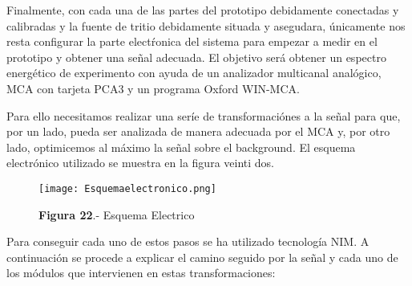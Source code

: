 Finalmente, con cada una de las partes del prototipo debidamente conectadas y calibradas y la fuente de tritio debidamente situada y asegudara, únicamente nos resta configurar la parte electŕonica del sistema para empezar a medir en el prototipo y obtener una señal adecuada. El objetivo será obtener un espectro energético de experimento con ayuda de un analizador multicanal analógico, MCA con tarjeta PCA3 y un programa Oxford WIN-MCA. 

Para ello necesitamos realizar una seríe de transformaciónes a la señal para que, por un lado,  pueda ser analizada de manera adecuada por el MCA y, por otro lado, optimicemos al máximo la señal sobre el background. El esquema electrónico utilizado se muestra en la figura veinti dos.

\begin{figure}[hbtp]
\centering
\texttt{[image: Esquemaelectronico.png]}
\caption{\textbf{Figura 22}.- Esquema Electrico~\cite{Andres}}
\end{figure}

Para conseguir cada uno de estos pasos se ha utilizado tecnología NIM. A continuación se procede a explicar el camino seguido por la señal y cada uno de los módulos que intervienen en estas transformaciones:

